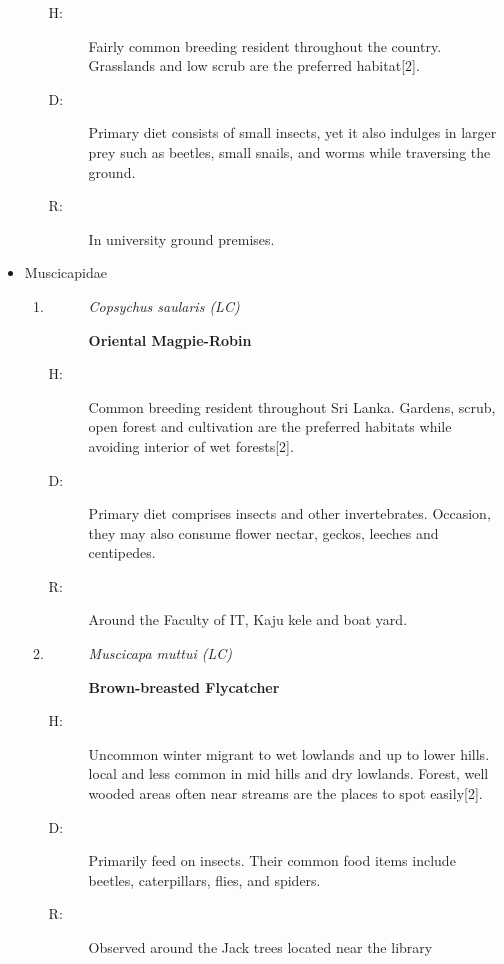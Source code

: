 \begin{itemize}
\begin{enumerate}
\begin{description}%
\item[H: ]%
Fairly common breeding resident throughout the country. Grasslands and low scrub are the preferred habitat{[}2{]}.%
\item[D: ]%
Primary diet consists of small insects, yet it also indulges in larger prey such as beetles, small snails, and worms while traversing the ground. %
\item[R: ]%
In university ground premises.%
\end{description}%
\end{enumerate}%
\item%
Muscicapidae%
\begin{enumerate}%
\item%
\begin{description}%
\item[]%
\textit{Copsychus saularis (LC)}%
\item[]%
\textbf{Oriental Magpie{-}Robin}%
\end{description}%
\begin{description}%
\item[H: ]%
Common breeding resident throughout Sri Lanka. Gardens, scrub, open forest and cultivation are the preferred habitats while avoiding interior of wet forests{[}2{]}.%
\item[D: ]%
Primary diet comprises insects and other invertebrates. Occasion, they may also consume flower nectar, geckos, leeches and centipedes.%
\item[R: ]%
Around the Faculty of IT, Kaju kele and boat yard.%
\end{description}%
\item%
\begin{description}%
\item[]%
\textit{Muscicapa muttui (LC)}%
\item[]%
\textbf{Brown{-}breasted Flycatcher}%
\end{description}%
\begin{description}%
\item[H: ]%
Uncommon winter migrant to wet lowlands and up to lower hills. local and less common in mid hills and dry lowlands. Forest, well wooded areas often near streams are the places to spot easily{[}2{]}.%
\item[D: ]%
Primarily feed on insects. Their common food items include beetles, caterpillars, flies, and spiders.%
\item[R: ]%
Observed around the Jack trees located near the library%

\end{description}
\end{enumerate}
\end{itemize}
